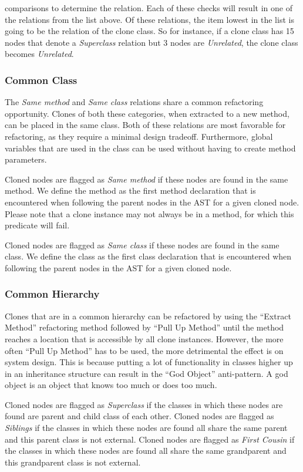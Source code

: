 comparisons to determine the relation. Each of these checks will result in one of the relations from the list above. Of these relations, the item lowest in the list is going to be the relation of the clone class. So for instance, if a clone class has 15 nodes that denote a \textit{Superclass} relation but 3 nodes are \textit{Unrelated}, the clone class becomes \textit{Unrelated}.

\subsubsection{Common Class}
The \textit{Same method} and \textit{Same class} relations share a common refactoring opportunity. Clones of both these categories, when extracted to a new method, can be placed in the same class. Both of these relations are most favorable for refactoring, as they require a minimal design tradeoff. Furthermore, global variables that are used in the class can be used without having to create method parameters.

Cloned nodes are flagged as \textit{Same method} if these nodes are found in the same method. We define the method as the first method declaration that is encountered when following the parent nodes in the AST for a given cloned node. Please note that a clone instance may not always be in a method, for which this predicate will fail.

Cloned nodes are flagged as \textit{Same class} if these nodes are found in the same class. We define the class as the first class declaration that is encountered when following the parent nodes in the AST for a given cloned node.

\subsubsection{Common Hierarchy}
Clones that are in a common hierarchy can be refactored by using the ``Extract Method'' refactoring method followed by ``Pull Up Method'' until the method reaches a location that is accessible by all clone instances. However, the more often ``Pull Up Method'' has to be used, the more detrimental the effect is on system design. This is because putting a lot of functionality in classes higher up in an inheritance structure can result in the ``God Object'' anti-pattern. A god object is an object that knows too much or does too much.

Cloned nodes are flagged as \textit{Superclass} if the classes in which these nodes are found are parent and child class of each other. Cloned nodes are flagged as \textit{Siblings} if the classes in which these nodes are found all share the same parent and this parent class is not external. Cloned nodes are flagged as \textit{First Cousin} if the classes in which these nodes are found all share the same grandparent and this grandparent class is not external.

